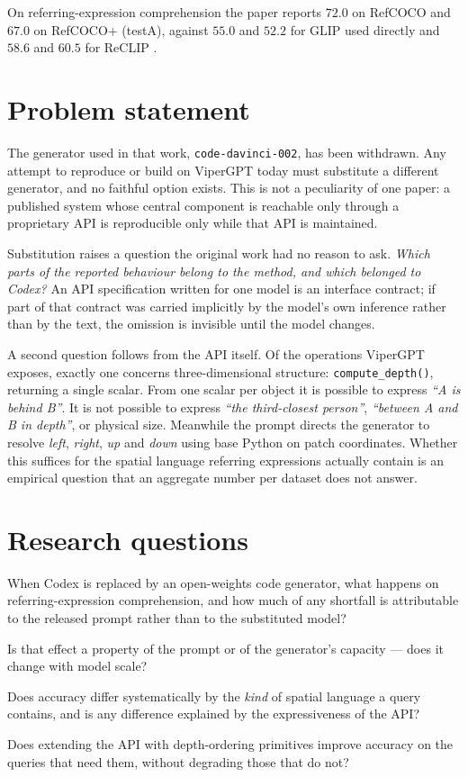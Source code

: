 \documentclass[12pt,a4paper,oneside]{report}
\begin{document}
On referring-expression comprehension the paper reports $72.0$ on RefCOCO and $67.0$
on RefCOCO+ (testA), against $55.0$ and $52.2$ for GLIP used directly and $58.6$ and
$60.5$ for ReCLIP \cite{subramanian2022reclip}.

\section{Problem statement}

The generator used in that work, \texttt{code-davinci-002}, has been withdrawn. Any
attempt to reproduce or build on ViperGPT today must substitute a different generator,
and no faithful option exists. This is not a peculiarity of one paper: a published
system whose central component is reachable only through a proprietary API is
reproducible only while that API is maintained.

Substitution raises a question the original work had no reason to ask. \emph{Which
parts of the reported behaviour belong to the method, and which belonged to Codex?}
An API specification written for one model is an interface contract; if part of that
contract was carried implicitly by the model's own inference rather than by the text,
the omission is invisible until the model changes.

A second question follows from the API itself. Of the operations ViperGPT exposes,
exactly one concerns three-dimensional structure: \texttt{compute\_depth()}, returning
a single scalar. From one scalar per object it is possible to express \emph{``A is
behind B''}. It is not possible to express \emph{``the third-closest person''},
\emph{``between A and B in depth''}, or physical size. Meanwhile the prompt directs
the generator to resolve \emph{left}, \emph{right}, \emph{up} and \emph{down} using
base Python on patch coordinates. Whether this suffices for the spatial language
referring expressions actually contain is an empirical question that an aggregate
number per dataset does not answer.

\section{Research questions}

\begin{description}[leftmargin=2.2em, style=nextline, itemsep=4pt]
\item[RQ1] When Codex is replaced by an open-weights code generator, what happens on
referring-expression comprehension, and how much of any shortfall is attributable to
the released prompt rather than to the substituted model?
\item[RQ2] Is that effect a property of the prompt or of the generator's capacity ---
does it change with model scale?
\item[RQ3] Does accuracy differ systematically by the \emph{kind} of spatial language
a query contains, and is any difference explained by the expressiveness of the API?
\item[RQ4] Does extending the API with depth-ordering primitives improve accuracy on
the queries that need them, without degrading those that do not?
\end{description}
\end{document}
